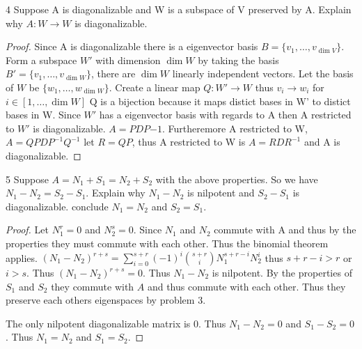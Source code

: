 \documentclass{article}
\begin{document}
\bigskip

\begin{PROB}{4}\label{Problem 4.}
    Suppose A is diagonalizable and W is a subspace of V preserved by A. Explain why $A: W \to W$ is diagonalizable. 
\end{PROB}
\begin{proof}
    Since A is diagonalizable there is a eigenvector basis $B = \{v_1, \ldots, v_{\dim V}\}$. Form a subspace $W'$ with dimension $\dim W$ by taking the basis $B' = \{v_1, \ldots, v_{\dim W}\}$, there are $\dim W$ linearly independent vectors. Let the basis of $W$ be $\{w_1, \ldots, w_{\dim W}\}$. Create a linear map $Q: W' \to W$ thus $v_i \to w_i$ for $i \in [1, \ldots, \dim W]$ Q is a bijection because it maps distict bases in W' to distict bases in W. Since $W'$ has a eigenvector basis with regards to A then A restricted to $W'$ is diagonalizable. $A = PDP{-1}$. Furtheremore A restricted to W, $A = QPDP^{-1}Q^{-1}$ let $R = QP$, thus A restricted to W is $A = RDR^{-1}$ and A is diagonalizable.
\end{proof}

\bigskip

\begin{PROB}{5}\label{Problem 5.}
    Suppose $A = N_1 + S_1 = N_2 + S_2$ with the above properties. So we have $N_1 - N_2 = S_2 - S_1$. Explain why $N_1 - N_2$ is nilpotent and $S_2 - S_1$ is diagonalizable. conclude $N_1 = N_2$ and $S_2 = S_1$. 
\end{PROB}
\begin{proof}
    Let $N_1^r = 0$ and $N_2^s = 0$. Since $N_1$ and $N_2$ commute with A and thus by the properties they must commute with each other. Thus the binomial theorem applies. $(N_1 - N_2)^{r + s} = \sum_{i = 0}^{s + r}(-1)^i{s+r \choose i}N_1^{s + r - i}N_2^{i}$ thus $s + r - i > r$ or $i > s$. Thus $(N_1 - N_2)^{r + s} = 0$. Thus $N_1 - N_2$ is nilpotent. By the properties of $S_1$ and $S_2$ they commute with $A$ and thus commute with each other. Thus they preserve each others eigenspaces by problem 3.   
    
    The only nilpotent diagonalizable matrix is 0. Thus $N_1 - N_2 = 0$ and $S_1 - S_2 = 0$. Thus $N_1 = N_2$ and $S_1 = S_2$.    
\end{proof}
\end{document}
